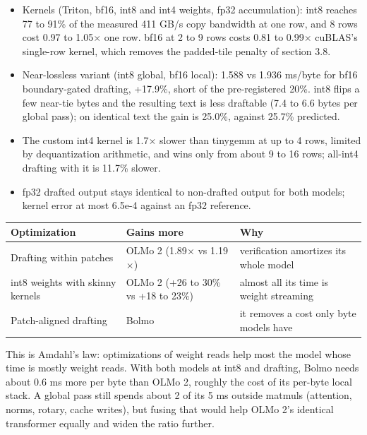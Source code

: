 \documentclass[11pt,a4paper]{article}
\newcommand{\x}{\ensuremath{\times}}
\begin{document}
\begin{itemize}
\item
  Kernels (Triton, bf16, int8 and int4 weights, fp32 accumulation): int8 reaches 77 to 91\% of the measured 411 GB/s copy bandwidth at one row, and 8 rows cost 0.97 to 1.05\x{} one row. bf16 at 2 to 9 rows costs 0.81 to 0.99\x{} cuBLAS's single-row kernel, which removes the padded-tile penalty of section 3.8.
\item
  Near-lossless variant (int8 global, bf16 local): 1.588 vs 1.936 ms/byte for bf16 boundary-gated drafting, +17.9\%, short of the pre-registered 20\%. int8 flips a few near-tie bytes and the resulting text is less draftable (7.4 to 6.6 bytes per global pass); on identical text the gain is 25.0\%, against 25.7\% predicted.
\item
  The custom int4 kernel is 1.7\x{} slower than tinygemm at up to 4 rows, limited by dequantization arithmetic, and wins only from about 9 to 16 rows; all-int4 drafting with it is 11.7\% slower.
\item
  fp32 drafted output stays identical to non-drafted output for both models; kernel error at most 6.5e-4 against an fp32 reference.
\end{itemize}

\begin{center}\small\setlength{\tabcolsep}{4pt}
\begin{tabular}{@{}>{\raggedright\arraybackslash}p{}>{\raggedright\arraybackslash}p{}>{\raggedright\arraybackslash}p{}@{}}
\toprule
\textbf{Optimization} & \textbf{Gains more} & \textbf{Why} \\
\midrule
Drafting within patches & OLMo 2 (1.89\x{} vs 1.19\x{}) & verification amortizes its whole model \\
int8 weights with skinny kernels & OLMo 2 (+26 to 30\% vs +18 to 23\%) & almost all its time is weight streaming \\
Patch-aligned drafting & Bolmo & it removes a cost only byte models have \\
\bottomrule
\end{tabular}
\end{center}

This is Amdahl's law: optimizations of weight reads help most the model whose time is mostly weight reads. With both models at int8 and drafting, Bolmo needs about 0.6 ms more per byte than OLMo 2, roughly the cost of its per-byte local stack. A global pass still spends about 2 of its 5 ms outside matmuls (attention, norms, rotary, cache writes), but fusing that would help OLMo 2's identical transformer equally and widen the ratio further.
\end{document}
